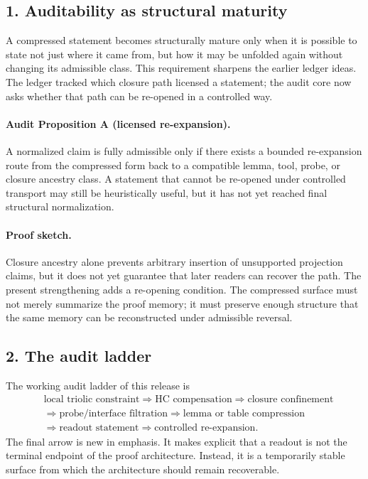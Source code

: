 \subsection*{1. Auditability as structural maturity}
A compressed statement becomes structurally mature only when it is possible to
state not just where it came from, but how it may be unfolded again without
changing its admissible class. This requirement sharpens the earlier ledger
ideas. The ledger tracked which closure path licensed a statement; the audit
core now asks whether that path can be re-opened in a controlled way.

\paragraph{Audit Proposition A (licensed re-expansion).}
A normalized claim is fully admissible only if there exists a bounded
re-expansion route from the compressed form back to a compatible lemma, tool,
probe, or closure ancestry class. A statement that cannot be re-opened under
controlled transport may still be heuristically useful, but it has not yet
reached final structural normalization.

\paragraph{Proof sketch.}
Closure ancestry alone prevents arbitrary insertion of unsupported projection
claims, but it does not yet guarantee that later readers can recover the path.
The present strengthening adds a re-opening condition. The compressed surface
must not merely summarize the proof memory; it must preserve enough structure
that the same memory can be reconstructed under admissible reversal.

\subsection*{2. The audit ladder}
The working audit ladder of this release is
\[
\begin{aligned}
&\text{local triolic constraint} \Longrightarrow \text{HC compensation} \Longrightarrow \text{closure confinement}\\
&\Longrightarrow \text{probe/interface filtration} \Longrightarrow \text{lemma or table compression}\\
&\Longrightarrow \text{readout statement} \Longrightarrow \text{controlled re-expansion}.
\end{aligned}
\]
The final arrow is new in emphasis. It makes explicit that a readout is not the
terminal endpoint of the proof architecture. Instead, it is a temporarily stable
surface from which the architecture should remain recoverable.

